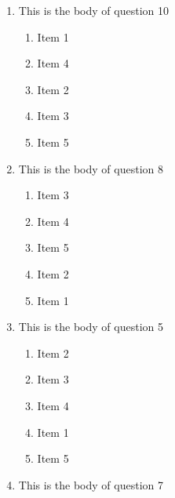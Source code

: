 \documentclass[amsfonts,bezier,leqno,fleqn,12pt,a4paper]{article}
\begin{document}
{{{{\begin{large}
\begin{enumerate}
\begin{enumerate}
\item  Item 2
\item  Item 1
\item  Item 3
\item  Item 5
\item  Item 4

\end{enumerate}
\newpage


\item This is the body of question 10
\vspace {0.3in}
\setcounter{equation}{0}

\begin{enumerate}
\item  Item 1
\item  Item 4
\item  Item 2
\item  Item 3
\item  Item 5

\end{enumerate}

\vspace {3.5cm}


\item This is the body of question 8
\vspace {0.3in}
\setcounter{equation}{0}

\begin{enumerate}
\item  Item 3
\item  Item 4
\item  Item 5
\item  Item 2
\item  Item 1

\end{enumerate}
\newpage


\item This is the body of question 5
\vspace {0.3in}
\setcounter{equation}{0}

\begin{enumerate}
\item  Item 2
\item  Item 3
\item  Item 4
\item  Item 1
\item  Item 5

\end{enumerate}

\vspace {3.5cm}


\item This is the body of question 7
\vspace {0.3in}
\setcounter{equation}{0}


\end{enumerate}
\end{large}}}}}
\end{document}
